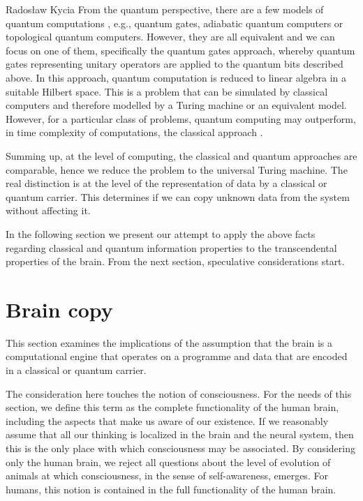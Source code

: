 \begin{artengenv}{Radosław Kycia}
From the quantum perspective, there are a few models of quantum computations \parencite{QuantumComputing}, e.g., quantum gates, adiabatic quantum computers or topological quantum computers. However, they are all equivalent and we can focus on one of them, specifically the quantum gates approach, whereby quantum gates representing unitary operators are applied to the quantum bits described above. In this approach, quantum computation is reduced to linear algebra in a suitable Hilbert space. This is a problem that can be simulated by classical computers and therefore modelled by a Turing machine or an equivalent model. However, for a particular class of problems, quantum computing may outperform, in time complexity of computations, the classical approach \parencite{QuantumComputing}.  

Summing up, at the level of computing, the classical and quantum approaches are comparable, hence we reduce the problem to the universal Turing machine. The real distinction is at the level of the representation of data by a classical or quantum carrier. This determines if we can copy unknown data from the system without affecting it.


In the following section we present our attempt to apply the above facts regarding classical and quantum information properties to the transcendental properties of the brain. From the next section, speculative considerations start.



\section{Brain copy}
This section examines the implications of the assumption that the brain is a computational engine that operates on a programme and data that are encoded in a classical or quantum carrier.


The consideration here touches the notion of consciousness. For the needs of this section, we define this term as the complete functionality of the human brain, including the aspects that make us aware of our existence. If we reasonably assume that all our thinking is localized in the brain and the neural system, then this is the only place with which consciousness may be associated. By considering only the human brain, we reject all questions about the level of evolution of animals at which consciousness, in the sense of self-awareness, emerges. For humans, this notion is contained in the full functionality of the human brain.


\end{artengenv}
